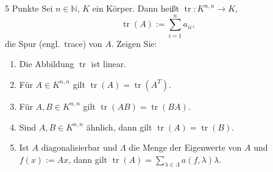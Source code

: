 \documentclass{problemset}
\author{Michael van Straten}
\begin{document}
\maketitle

\begin{problem}{5 Punkte}
Sei $n \in \mathbb{N}$, $K$ ein Körper. Dann heißt $\operatorname{tr} : K^{n,n} \to K$,
\[ \operatorname{tr}(A) := \sum_{i=1}^{n} a_{ii}, \]
die Spur (engl.\ trace) von $A$. Zeigen Sie:
\begin{enumerate}
    \item Die Abbildung $\operatorname{tr}$ ist linear.
    \item Für $A \in K^{n,n}$ gilt $\operatorname{tr}(A) =
              \operatorname{tr}(A^T)$.
    \item Für $A, B \in K^{n,n}$ gilt $\operatorname{tr}(AB) =
              \operatorname{tr}(BA)$.
    \item Sind $A, B \in K^{n,n}$ ähnlich, dann gilt $\operatorname{tr}(A) =
              \operatorname{tr}(B)$.
    \item Ist $A$ diagonalisierbar und $\Lambda$ die Menge der Eigenwerte von
          $A$ und $f(x) := Ax$, dann gilt $\operatorname{tr}(A) = \sum_{\lambda
                  \in \Lambda} a(f, \lambda)\lambda$.
\end{enumerate}
\end{problem}
\end{document}

